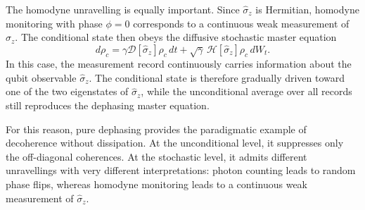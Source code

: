 The homodyne unravelling is equally important. Since \(\hat \sigma_z\) is Hermitian, homodyne monitoring with phase \(\phi=0\) corresponds to a continuous weak measurement of \(\hat \sigma_z\). The conditional state then obeys the diffusive stochastic master equation
\begin{equation}
	d\rho_c
	=
	\gamma \mathcal{D}[\hat \sigma_z]\rho_c\,dt
	+
	\sqrt{\gamma}\,\mathcal{H}[\hat \sigma_z]\rho_c\,dW_t.
	\label{eq:single_qubit_dephasing_homodyne_sme}
\end{equation}
In this case, the measurement record continuously carries information about the qubit observable \(\hat \sigma_z\). The conditional state is therefore gradually driven toward one of the two eigenstates of \(\hat \sigma_z\), while the unconditional average over all records still reproduces the dephasing master equation.

For this reason, pure dephasing provides the paradigmatic example of decoherence without dissipation. At the unconditional level, it suppresses only the off-diagonal coherences. At the stochastic level, it admits different unravellings with very different interpretations: photon counting leads to random phase flips, whereas homodyne monitoring leads to a continuous weak measurement of \(\hat \sigma_z\).
